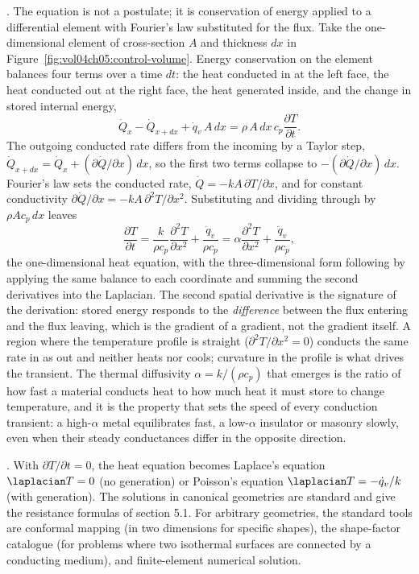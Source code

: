 . The equation is not a
postulate; it is conservation of energy applied to a differential element with
Fourier's law substituted for the flux. Take the one-dimensional element of
cross-section $A$ and thickness $dx$ in
Figure~\ref{fig:vol04ch05:control-volume}. Energy conservation on the element
balances four terms over a time $dt$: the heat conducted in at the left face,
the heat conducted out at the right face, the heat generated inside, and the
change in stored internal energy,
\[
\dot{Q}_x - \dot{Q}_{x+dx} + \dot{q}_v\,A\,dx = \rho\,A\,dx\,c_p
\frac{\partial T}{\partial t}.
\]
The outgoing conducted rate differs from the incoming by a Taylor step,
$\dot{Q}_{x+dx} = \dot{Q}_x + (\partial \dot{Q}/\partial x)\,dx$, so the first
two terms collapse to $-(\partial \dot{Q}/\partial x)\,dx$. Fourier's law sets
the conducted rate, $\dot{Q} = -kA\,\partial T/\partial x$, and for constant
conductivity $\partial \dot{Q}/\partial x = -kA\,\partial^2 T/\partial x^2$.
Substituting and dividing through by $\rho A c_p\,dx$ leaves
\[
\frac{\partial T}{\partial t} = \frac{k}{\rho c_p}
\frac{\partial^2 T}{\partial x^2} + \frac{\dot{q}_v}{\rho c_p} = \alpha
\frac{\partial^2 T}{\partial x^2} + \frac{\dot{q}_v}{\rho c_p},
\]
the one-dimensional heat equation, with the three-dimensional form following by
applying the same balance to each coordinate and summing the second derivatives
into the Laplacian. The second spatial derivative is the signature of the
derivation: stored energy responds to the \emph{difference} between the flux
entering and the flux leaving, which is the gradient of a gradient, not the
gradient itself. A region where the temperature profile is straight
($\partial^2 T/\partial x^2 = 0$) conducts the same rate in as out and neither
heats nor cools; curvature in the profile is what drives the transient. The
thermal diffusivity $\alpha = k/(\rho c_p)$ that emerges is the ratio of how
fast a material conducts heat to how much heat it must store to change
temperature, and it is the property that sets the speed of every conduction
transient: a high-$\alpha$ metal equilibrates fast, a low-$\alpha$ insulator or
masonry slowly, even when their steady conductances differ in the opposite
direction.



. With $\partial T/\partial t = 0$,
the heat equation becomes Laplace's equation $\laplacian T = 0$ (no
generation) or Poisson's equation $\laplacian T = -\dot{q}_v/k$ (with
generation). The solutions in canonical geometries are standard and
give the resistance formulas of section 5.1. For arbitrary geometries,
the standard tools are conformal mapping (in two dimensions for
specific shapes), the shape-factor catalogue (for problems where two
isothermal surfaces are connected by a conducting medium), and
finite-element numerical solution.

